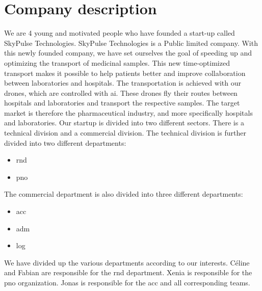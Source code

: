 \chapter{Company description} \label{description}

We are 4 young and motivated people who have founded a start-up called SkyPulse Technologies. SkyPulse Technologies is a Public limited company. With this newly founded company, we have set ourselves the goal of speeding up and optimizing the transport of medicinal samples. This new time-optimized transport makes it possible to help patients better and improve collaboration between laboratories and hospitals. The transportation is achieved with our drones, which are controlled with \ac{ai}. These drones fly their routes between hospitals and laboratories and transport the respective samples.
\newline
The target market is therefore the pharmaceutical industry, and more specifically hospitals and laboratories.
\newline
Our startup is divided into two different sectors. There is a technical division and a commercial division. The technical division is further divided into two different departments:
\begin{itemize}
  \item \acl{rnd}
  \item \acl{pno}
\end{itemize}
The commercial department is also divided into three different departments:
\begin{itemize}
  \item \acl{acc}
  \item \acl{adm}
  \item \acl{log}
\end{itemize}
We have divided up the various departments according to our interests. Céline and Fabian are responsible for the \acl{rnd} department. Xenia is responsible for the \acl{pno} organization. Jonas is responsible for the \acl{acc} and all corresponding teams.